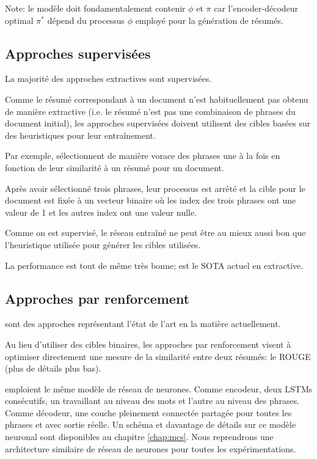 Note: le modèle doit fondamentalement contenir $\phi$ et $\pi$ car
l'encoder-décodeur optimal $\pi^*$ dépend du processus $\phi$ employé
pour la génération de résumés.

\subsection{Approches supervisées}

La majorité des approches extractives sont supervisées.

Comme le résumé correspondant à un document n'est habituellement pas obtenu de
manière extractive (i.e. le résumé n'est pas une combinaison de phrases du document initial),
les approches supervisées doivent utilisent des cibles basées sur des heuristiques pour
leur entraînement.

Par exemple, \citep{10.5555/3298483.3298681} sélectionnent de manière vorace
des phrases une à la fois en fonction de leur similarité à un résumé pour
un document.

Après avoir sélectionné trois phrases, leur processus est arrêté et la cible pour le
document est fixée à un vecteur binaire où les index des trois phrases ont une valeur
de 1 et les autres index ont une valeur nulle.

Comme on est supervisé, le réseau entraîné ne peut être au mieux aussi bon que l'heuristique
utilisée pour générer les cibles utilisées.

La performance est tout de même très bonne; \citep{zhong-etal-2020-extractive} est le SOTA
actuel en extractive.

\subsection{Approches par renforcement}

\citep{dong2018banditsum,luo-etal-2019-reading}
sont des approches représentant l'état de l'art en la matière actuellement.

Au lieu d'utiliser des cibles binaires, les approches par renforcement visent à
optimiser directement une mesure de la similarité entre deux résumés: le ROUGE \citep{lin-2004-rouge}
(plus de détails plus bas).

\citep{dong2018banditsum,luo-etal-2019-reading} emploient le
même modèle de réseau de neurones.
Comme encodeur, deux LSTMs consécutifs, un travaillant au niveau
des mots et l'autre au niveau des phrases.
Comme décodeur, une couche pleinement connectée partagée pour toutes les
phrases et avec sortie réelle.
Un schéma et davantage de détails sur ce modèle neuronal sont disponibles
au chapitre \ref{chap:mcs}.
Nous reprendrons une architecture similaire de réseau de neurones pour toutes
les expérimentations.

